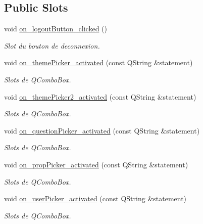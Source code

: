 \subsection*{Public Slots}
\begin{DoxyCompactItemize}
\item 
void \mbox{\hyperlink{classManageWindow_aa8300cda04fa827c9335fa58a4286528}{on\+\_\+logout\+Button\+\_\+clicked}} ()
\begin{DoxyCompactList}\small\item\em Slot du bouton de deconnexion. \end{DoxyCompactList}\item 
void \mbox{\hyperlink{classManageWindow_a125df0273d83768ef398e20b95dc1f27}{on\+\_\+theme\+Picker\+\_\+activated}} (const Q\+String \&statement)
\begin{DoxyCompactList}\small\item\em Slots de Q\+Combo\+Box. \end{DoxyCompactList}\item 
void \mbox{\hyperlink{classManageWindow_a57fb9a37381bb5498c55b719a258d869}{on\+\_\+theme\+Picker2\+\_\+activated}} (const Q\+String \&statement)
\begin{DoxyCompactList}\small\item\em Slots de Q\+Combo\+Box. \end{DoxyCompactList}\item 
void \mbox{\hyperlink{classManageWindow_aebb1e761d8f734bd825bf07926b82bd1}{on\+\_\+question\+Picker\+\_\+activated}} (const Q\+String \&statement)
\begin{DoxyCompactList}\small\item\em Slots de Q\+Combo\+Box. \end{DoxyCompactList}\item 
void \mbox{\hyperlink{classManageWindow_ac4bafce26b6113a4490f5609e8cdd17b}{on\+\_\+prop\+Picker\+\_\+activated}} (const Q\+String \&statement)
\begin{DoxyCompactList}\small\item\em Slots de Q\+Combo\+Box. \end{DoxyCompactList}\item 
void \mbox{\hyperlink{classManageWindow_a5aeb8691ae16f640a8d22809459a7a9d}{on\+\_\+user\+Picker\+\_\+activated}} (const Q\+String \&statement)
\begin{DoxyCompactList}\small\item\em Slots de Q\+Combo\+Box. \end{DoxyCompactList}\item 

\end{DoxyCompactItemize}
